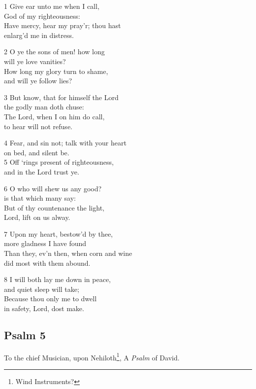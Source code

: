 1 Give ear unto me when I call,\\
God of my righteousness:\\
Have mercy, hear my pray’r; thou hast\\
enlarg’d me in distress.

2 O ye the sons of men! how long\\
will ye love vanities?\\
How long my glory turn to shame,\\
and will ye follow lies?

3 But know, that for himself the Lord\\
the godly man doth chuse:\\
The Lord, when I on him do call,\\
to hear will not refuse.

4 Fear, and sin not; talk with your heart\\
on bed, and silent be.\\
5 Off ‘rings present of righteousness,\\
and in the Lord trust ye.

6 O who will shew us any good?\\
is that which many say:\\
But of thy countenance the light,\\
Lord, lift on us alway.

7 Upon my heart, bestow’d by thee,\\
more gladness I have found\\
Than they, ev’n then, when corn and wine\\
did most with them abound.

8 I will both lay me down in peace,\\
and quiet sleep will take;\\
Because thou only me to dwell\\
in safety, Lord, dost make.

\begin{center}
\quad{}\quad{}
\end{center}


\subsection*{Psalm 5}

To the chief Musician, upon Nehiloth\footnote{Wind Instruments?},
A \emph{Psalm} of David.

